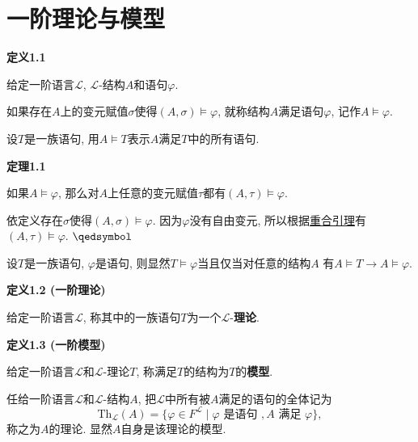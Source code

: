


\setlength{\abovedisplayskip}{1pt}
\setlength{\belowdisplayskip}{1pt}

\section{一阶理论与模型}

\hypertarget{sec:定义1.1}{}
\noindent\textbf{定义1.1}

给定一阶语言$\mathcal{L}$, $\mathcal{L}$-结构$A$和语句$\varphi$.

如果存在$A$上的变元赋值$\sigma$使得$(A,\sigma)\models\varphi$,
就称结构$A$满足语句$\varphi$, 记作$A\models\varphi$.

\vspace{10pt}

设$T$是一族语句, 用$A\models T$表示$A$满足$T$中的所有语句.

\vspace{10pt}

\hypertarget{sec:定理1.1}{}
\noindent\textbf{定理1.1}

如果$A\models\varphi$, 那么对$A$上任意的变元赋值$\tau$都有$(A,\tau)\models\varphi$.


依定义存在$\sigma$使得$(A,\sigma)\models\varphi$. 因为$\varphi$没有自由变元,
所以根据\href{01 重合引理#nameddest=sec:定理1.2}{重合引理}有
$(A,\tau)\models\varphi$. \hfill $\qedsymbol$

\vspace{10pt}

设$T$是一族语句, $\varphi$是语句, 则显然$T\models\varphi$当且仅当对任意的结构$A$
有$A\models T\to A\models\varphi$.

\vspace{10pt}

\hypertarget{sec:定义1.2}{}
\noindent\textbf{定义1.2 (一阶理论)}

给定一阶语言$\mathcal{L}$, 称其中的一族语句$T$为一个$\mathcal{L}$-\textbf{理论}.

\vspace{10pt}

\hypertarget{sec:定义1.3}{}
\noindent\textbf{定义1.3 (一阶模型)}

给定一阶语言$\mathcal{L}$和$\mathcal{L}$-理论$T$, 称满足$T$的结构为$T$的\textbf{模型}.

\vspace{10pt}

任给一阶语言$\mathcal{L}$和$\mathcal{L}$-结构$A$,
把$\mathcal{L}$中所有被$A$满足的语句的全体记为
\[
    \mathrm{Th}_{\mathcal{L}}(A)=\{\varphi\in F^{\mathcal{L}}\mid
    \varphi\text{\ 是语句\ },A\text{\ 满足\ }\varphi\},
\]
称之为$A$的理论. 显然$A$自身是该理论的模型.






